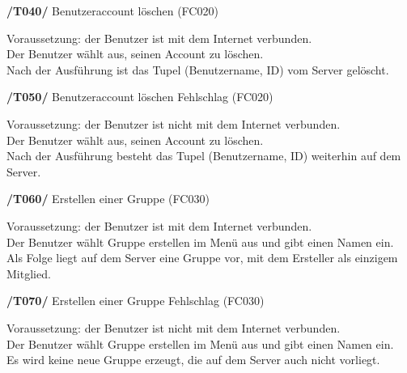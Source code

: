 \textbf{/T040/} Benutzeraccount löschen (FC020) \\
\begin{center}
\vspace{-\parskip}
\begin{minipage}[t]{0.9\textwidth}
Voraussetzung: der Benutzer ist mit dem Internet verbunden.               \\
Der Benutzer wählt aus, seinen Account zu löschen.                         \\
Nach der Ausführung ist das Tupel (Benutzername, ID) vom Server gelöscht.   \\
\end{minipage}
\end{center}

\textbf{/T050/} Benutzeraccount löschen Fehlschlag (FC020) \\
\begin{center}
\vspace{-\parskip}
\begin{minipage}[t]{0.9\textwidth}
Voraussetzung: der Benutzer ist nicht mit dem Internet verbunden.            \\
Der Benutzer wählt aus, seinen Account zu löschen.                            \\
Nach der Ausführung besteht das Tupel (Benutzername, ID) weiterhin auf dem Server.\\
\end{minipage}
\end{center}

\textbf{/T060/} Erstellen einer Gruppe (FC030)\\
\begin{center}
\vspace{-\parskip}
\begin{minipage}[t]{0.9\textwidth}
Voraussetzung: der Benutzer ist mit dem Internet verbunden.                        \\
Der Benutzer wählt Gruppe erstellen im Menü aus und gibt einen Namen ein.           \\
Als Folge liegt auf dem Server eine Gruppe vor, mit dem Ersteller als einzigem Mitglied.\\
\end{minipage}
\end{center}

\textbf{/T070/} Erstellen einer Gruppe Fehlschlag (FC030)\\
\begin{center}
\vspace{-\parskip}
\begin{minipage}[t]{0.9\textwidth}
Voraussetzung: der Benutzer ist nicht mit dem Internet verbunden.              \\
Der Benutzer wählt Gruppe erstellen im Menü aus und gibt einen Namen ein.       \\
Es wird keine neue Gruppe erzeugt, die auf dem Server auch nicht vorliegt.       \\
\end{minipage}
\end{center}

